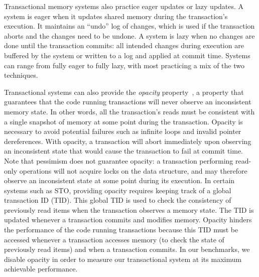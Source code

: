 Transactional memory systems also practice eager updates or lazy updates. A system is eager when it updates shared memory during the transaction's execution. It maintains an ``undo'' log of changes, which is used if the transaction aborts and the changes need to be undone. 
A system is lazy when no changes are done until the transaction commits: all intended changes during execution are buffered by the system or written to a log and applied at commit time. Systems can range from fully eager to fully lazy, with most practicing a mix of the two techniques.

Transactional systems can also provide the \emph{opacity} property~\cite{opacity}, a property that guarantees that the code running transactions will never observe an inconsistent memory state. 
In other words, all the transaction's reads must be consistent with a single snapshot of memory at some point during the transaction.
Opacity is necessary to avoid potential failures such as infinite loops and invalid pointer dereferences. With opacity, a transaction will abort immediately upon observing an inconsistent state that would cause the transaction to fail at commit time. Note that pessimism does not guarantee opacity: a transaction performing read-only operations will not acquire locks on the data structure, and may therefore observe an inconsistent state at some point during its execution.
In certain systems such as STO, providing opacity requires keeping track of a global transaction ID (TID). This global TID is used to check the consistency of previously read items when the transaction observes a memory state. The TID is updated whenever a transaction commits and modifies memory. Opacity hinders the performance of the code running transactions because this TID must be accessed whenever a transaction accesses memory (to check the state of previously read items) and when a transaction commits. In our benchmarks, we disable opacity in order to measure our transactional system at its maximum achievable performance.

